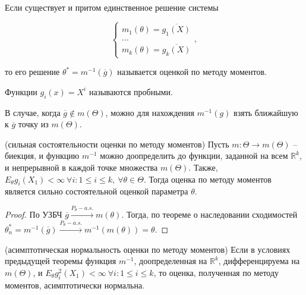 \begin{definition}
Если существует и притом единственное решение системы


\begin{equation*}
\begin{cases}
m_{1}( \theta ) =\overline{g_{1}( X)}\\
\dotsc \\
m_{k}( \theta ) =\overline{g_{k}( X)}
\end{cases} ,
\end{equation*}


то его решение $\displaystyle \theta ^{*} =m^{-1}(\overline{g})$ называется оценкой по методу моментов.
\end{definition}
\begin{definition}
Функции $\displaystyle g_{i}( x) =X^{i}$ называются пробными.
\end{definition}
\begin{note}
В случае, когда $\displaystyle \overline{g} \notin m( \Theta )$, можно для нахождения $\displaystyle m^{-1}( g)$ взять ближайшую к $\displaystyle \overline{g}$ точку из $\displaystyle m( \Theta )$.
\end{note}
\begin{theorem}
(сильная состоятельности оценки по методу моментов) Пусть $\displaystyle m:\Theta \rightarrow m( \Theta )$ -- биекция, и функцию $\displaystyle m^{-1}$ можно доопределить до функции, заданной на всем $\displaystyle \mathbb{R}^{k}$, и непрерывной в каждой точке множества $\displaystyle m( \Theta )$. Также, $\displaystyle E_{\theta } g_{i}( X_{1}) < \infty \ \forall i:1\leqslant i\leqslant k,\ \forall \theta \in \Theta $. Тогда оценка по методу моментов является сильно состоятельной оценкой параметра $\displaystyle \theta $.
\end{theorem}
\begin{proof}
    По УЗБЧ $\displaystyle \overline{g}\xrightarrow{P_{\theta } -a.s.} m( \theta )$. Тогда, по теореме о наследовании сходимостей $\displaystyle \theta _{n}^{*} =m^{-1}(\overline{g})\xrightarrow{P_{\theta } -a.s.} m^{-1}( m( \theta )) =\theta $.
\end{proof}
\begin{theorem}
(асимптотическая нормальность оценки по методу моментов) Если в условиях предыдущей теоремы функция $\displaystyle m^{-1}$, доопределенная на $\displaystyle \mathbb{R}^{k}$, дифференцируема на $\displaystyle m( \Theta )$, и $\displaystyle E_{\theta } g_{i}^{2}( X_{1}) < \infty \ \forall i:1\leqslant i\leqslant k$, то оценка, полученная по методу моментов, асимптотически нормальна.
\end{theorem}
